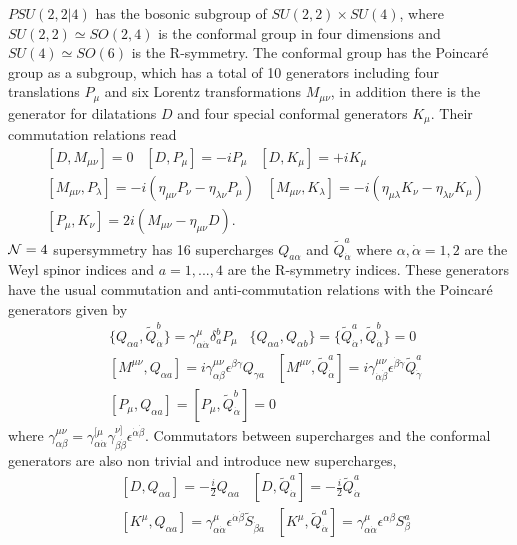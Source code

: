 $PSU(2,2|4)$ has the bosonic subgroup of $SU(2,2) \times SU(4)$, where $SU(2,2) \simeq SO(2,4)$ is the conformal group in four dimensions and $SU(4) \simeq SO(6)$ is the R-symmetry. 
The conformal group has the Poincar\'{e} group as a subgroup, which has a total of 10 generators including four translations $P_\mu$ and six Lorentz transformations $M_{\mu\nu}$, in addition there is the generator for dilatations $D$ and four special conformal generators $K_\mu$. 
Their commutation relations read
\begin{eqnarray}
 &[D, M_{\mu\nu}] = 0 \; \; \; [D, P_\mu] = -i P_\mu \; \; \; [D, K_\mu] = +i K_\mu  \nonumber\\
 &[M_{\mu\nu}, P_\lambda] = -i(\eta_{\mu\nu} P_\nu - \eta_{\lambda\nu} P_\mu) \; \; \; [M_{\mu\nu}, K_\lambda] = -i(\eta_{\mu\lambda} K_\nu - \eta_{\lambda\nu} K_\mu)  \nonumber\\
 &[P_\mu, K_\nu] = 2i(M_{\mu\nu} - \eta_{\mu\nu} D).
 \label{eq:conformal_group}
\end{eqnarray}
$\mathcal{N}=4$ supersymmetry has 16 supercharges $Q_{a\alpha}$ and $\tilde{Q}^a_{\dot{\alpha}}$ where $\alpha, \dot{\alpha} = 1, 2$ are the Weyl spinor indices and $a = 1,...,4$ are the R-symmetry indices. 
These generators have the usual commutation and anti-commutation relations with the Poincar\'{e} generators given by
\begin{eqnarray}
	& \{Q_{\alpha a}, \tilde{Q}^b_{\dot{\alpha}}\} = \gamma^\mu_{\alpha\dot{\alpha}} \delta_a^b P_\mu \; \; \; \{Q_{\alpha a}, Q_{\alpha b}\} = \{ \tilde{Q}^a_{\dot{\alpha}}, \tilde{Q}^b_{\dot{\alpha}} \} = 0 \nonumber\\
	& [M^{\mu\nu}, Q_{\alpha a}] = i \gamma^{\mu\nu}_{\alpha\beta} \epsilon^{\beta\gamma} Q_{\gamma a} \; \; \; [M^{\mu\nu}, \tilde{Q}^a_{\dot{\alpha}}] = i \gamma^{\mu\nu}_{\dot{\alpha}\dot{\beta}} \epsilon^{\dot{\beta}\dot{\gamma}} \tilde{Q}_{\dot{\gamma}}^a \nonumber \\
	& [P_\mu, Q_{\alpha a}] = [P_\mu, \tilde{Q}^b_{\dot{\alpha}}] = 0 
\end{eqnarray} 
where $\gamma_{\alpha\beta}^{\mu\nu} = \gamma^{[\mu}_{\alpha\dot{\alpha}} \gamma^{\nu]}_{\beta\dot{\beta}} \epsilon^{\dot{\alpha}\dot{\beta}}$. 
Commutators between supercharges and the conformal generators are also non trivial and introduce new supercharges,
\begin{eqnarray}
	& [D, Q_{\alpha a}] = -\frac{i}{2} Q_{\alpha a} \; \; \; [D, \tilde{Q}_{\dot{\alpha}}^a] = -\frac{i}{2} \tilde{Q}_{\dot{\alpha}}^a \nonumber \\
	& [K^\mu,  Q_{\alpha a}] = \gamma^\mu_{\alpha\dot{\alpha}} \epsilon^{\dot{\alpha} \dot{\beta}} \tilde{S}_{\dot{\beta} a} \; \; \; [K^\mu, \tilde{Q}_{\dot{\alpha}}^a] = \gamma^\mu_{\alpha\dot{\alpha}} \epsilon^{\alpha\beta} S_\beta^a
	\label{eq:dq_commutators}
\end{eqnarray}
